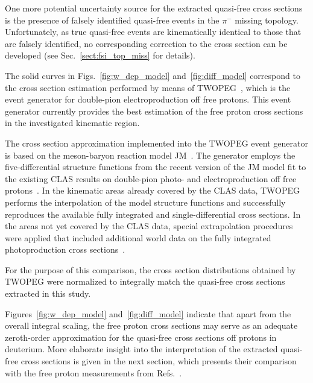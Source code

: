 \documentclass[prc,twocolumn,superscriptaddress,showpacs,amssymb,amsmath,amsfonts,aps,nofootinbib]{revtex4-1}
\begin{document}
One more potential uncertainty source for the extracted quasi-free cross sections is the presence of falsely identified quasi-free events in the $\pi^{-}$ missing topology. Unfortunately, as true quasi-free events are kinematically identical to those that are falsely identified, no corresponding correction to the cross section can be developed (see Sec.\!~\ref{sect:fsi_top_miss} for details).

The solid curves in Figs.~\ref{fig:w_dep_model} and~\ref{fig:diff_model} correspond to the cross section estimation performed by means of TWOPEG~\cite{twopeg}, which is the event generator for double-pion electroproduction off free protons. This event generator currently provides the best estimation of the free proton cross sections in the investigated kinematic region.



The cross section approximation implemented into the TWOPEG event generator is based on the meson-baryon reaction model JM~\cite{Mokeev:2008iw,Mokeev:2012vsa,Mokeev:2015lda}. The generator employs the five-differential structure functions from the recent version of the JM model fit to the existing CLAS results on double-pion photo- and electroproduction off free protons~\cite{Ripani:2002ss,Mokeev:2012vsa,Fedotov:2008aa,Golovach}. In the kinematic areas already covered by the CLAS data, TWOPEG performs the interpolation of the model structure functions and successfully reproduces the available fully integrated and single-differential cross sections. In the areas not yet covered by the CLAS data, special extrapolation procedures were applied that included additional world data on the fully integrated photoproduction cross sections~\cite{Wu:2005wf,ABBHHM:1968aa}. 


For the purpose of this comparison, the cross section distributions obtained by TWOPEG were normalized to integrally match the quasi-free cross sections extracted in this study.



Figures~\ref{fig:w_dep_model} and~\ref{fig:diff_model} indicate that apart from the overall integral scaling, the free proton cross sections may serve as an adequate zeroth-order approximation for the quasi-free cross sections off protons in deuterium. More elaborate insight into the interpretation of the extracted quasi-free cross sections is given in the next section, which presents their comparison with the free proton measurements from Refs.\!~\cite{Fed_an_note:2017,Fed_paper_2018}.
\end{document}
